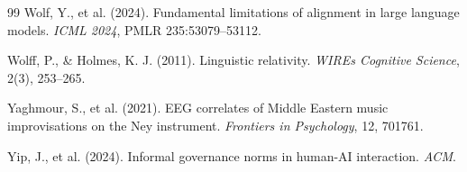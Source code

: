\documentclass[11pt,a4paper]{article}
\begin{document}
\begin{thebibliography}{99}
Wolf, Y., et al. (2024). Fundamental limitations of alignment in large language models. \textit{ICML 2024}, PMLR 235:53079--53112.

Wolff, P., \& Holmes, K. J. (2011). Linguistic relativity. \textit{WIREs Cognitive Science}, 2(3), 253--265.

Yaghmour, S., et al. (2021). EEG correlates of Middle Eastern music improvisations on the Ney instrument. \textit{Frontiers in Psychology}, 12, 701761.

Yip, J., et al. (2024). Informal governance norms in human-AI interaction. \textit{ACM}.

\end{thebibliography}
\end{document}
